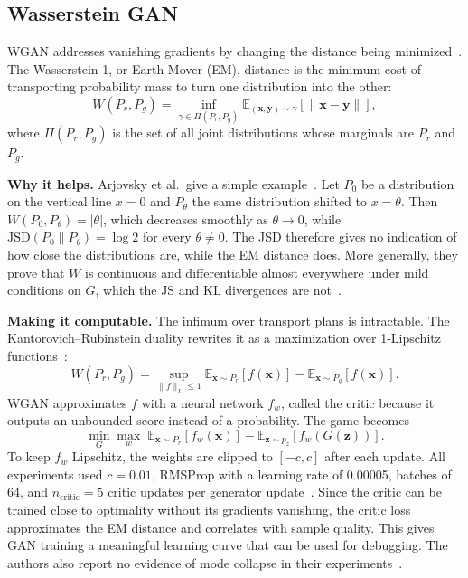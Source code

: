 \documentclass[conference]{IEEEtran}
\newcommand{\E}{\mathbb{E}}
\newcommand{\JSD}{\mathrm{JSD}}
\begin{document}
\subsection{Wasserstein GAN}
WGAN addresses vanishing gradients by changing the distance being minimized~\cite{arjovsky2017}. The Wasserstein-1, or Earth Mover (EM), distance is the minimum cost of transporting probability mass to turn one distribution into the other:
\begin{equation}
W(P_r,P_g)=\inf_{\gamma\in\Pi(P_r,P_g)}\E_{(\mathbf{x},\mathbf{y})\sim\gamma}\left[\|\mathbf{x}-\mathbf{y}\|\right],
\end{equation}
where $\Pi(P_r,P_g)$ is the set of all joint distributions whose marginals are $P_r$ and $P_g$.

\textbf{Why it helps.} Arjovsky et al.\ give a simple example~\cite{arjovsky2017}. Let $P_0$ be a distribution on the vertical line $x=0$ and $P_\theta$ the same distribution shifted to $x=\theta$. Then $W(P_0,P_\theta)=|\theta|$, which decreases smoothly as $\theta\to0$, while $\JSD(P_0\|P_\theta)=\log2$ for every $\theta\ne0$. The JSD therefore gives no indication of how close the distributions are, while the EM distance does. More generally, they prove that $W$ is continuous and differentiable almost everywhere under mild conditions on $G$, which the JS and KL divergences are not~\cite[Thm.~1]{arjovsky2017}.

\textbf{Making it computable.} The infimum over transport plans is intractable. The Kantorovich--Rubinstein duality rewrites it as a maximization over 1-Lipschitz functions~\cite{arjovsky2017}:
\begin{equation}
W(P_r,P_g)=\sup_{\|f\|_L\le1}\E_{\mathbf{x}\sim P_r}[f(\mathbf{x})]-\E_{\mathbf{x}\sim P_g}[f(\mathbf{x})].
\end{equation}
WGAN approximates $f$ with a neural network $f_w$, called the critic because it outputs an unbounded score instead of a probability. The game becomes
\begin{equation}
\min_G\max_{w}\;\E_{\mathbf{x}\sim P_r}[f_w(\mathbf{x})]-\E_{\mathbf{z}\sim p_z}[f_w(G(\mathbf{z}))].
\end{equation}
To keep $f_w$ Lipschitz, the weights are clipped to $[-c,c]$ after each update. All experiments used $c=0.01$, RMSProp with a learning rate of 0.00005, batches of 64, and $n_{\mathrm{critic}}=5$ critic updates per generator update~\cite{arjovsky2017}. Since the critic can be trained close to optimality without its gradients vanishing, the critic loss approximates the EM distance and correlates with sample quality. This gives GAN training a meaningful learning curve that can be used for debugging. The authors also report no evidence of mode collapse in their experiments~\cite{arjovsky2017}.
\end{document}
